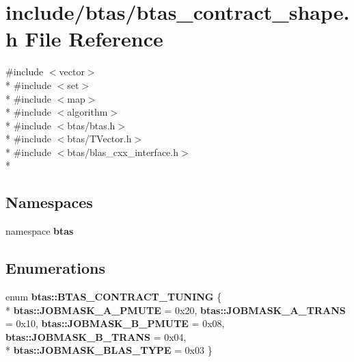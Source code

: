 \section{include/btas/btas\-\_\-contract\-\_\-shape.h File Reference}
\label{dd/d9e/btas__contract__shape_8h}
{\ttfamily \#include $<$vector$>$}\\*
{\ttfamily \#include $<$set$>$}\\*
{\ttfamily \#include $<$map$>$}\\*
{\ttfamily \#include $<$algorithm$>$}\\*
{\ttfamily \#include $<$btas/btas.\-h$>$}\\*
{\ttfamily \#include $<$btas/\-T\-Vector.\-h$>$}\\*
{\ttfamily \#include $<$btas/blas\-\_\-cxx\-\_\-interface.\-h$>$}\\*
\subsection*{Namespaces}
\begin{DoxyCompactItemize}
\item 
namespace {\bf btas}
\end{DoxyCompactItemize}
\subsection*{Enumerations}
\begin{DoxyCompactItemize}
\item 
enum {\bf btas\-::\-B\-T\-A\-S\-\_\-\-C\-O\-N\-T\-R\-A\-C\-T\-\_\-\-T\-U\-N\-I\-N\-G} \{ \\*
{\bf btas\-::\-J\-O\-B\-M\-A\-S\-K\-\_\-\-A\-\_\-\-P\-M\-U\-T\-E} = 0x20, 
{\bf btas\-::\-J\-O\-B\-M\-A\-S\-K\-\_\-\-A\-\_\-\-T\-R\-A\-N\-S} = 0x10, 
{\bf btas\-::\-J\-O\-B\-M\-A\-S\-K\-\_\-\-B\-\_\-\-P\-M\-U\-T\-E} = 0x08, 
{\bf btas\-::\-J\-O\-B\-M\-A\-S\-K\-\_\-\-B\-\_\-\-T\-R\-A\-N\-S} = 0x04, 
\\*
{\bf btas\-::\-J\-O\-B\-M\-A\-S\-K\-\_\-\-B\-L\-A\-S\-\_\-\-T\-Y\-P\-E} = 0x03
 \}
\end{DoxyCompactItemize}
